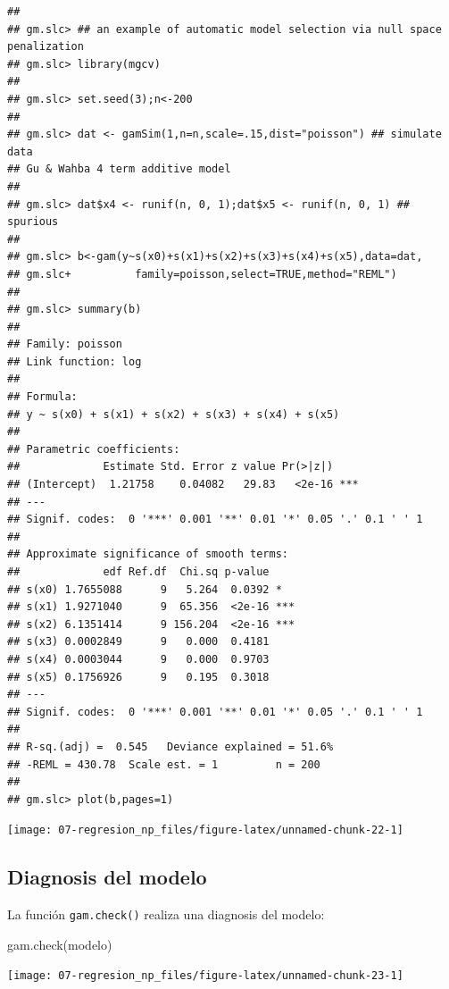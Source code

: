 \documentclass[
]{book}
\newenvironment{Shaded}{\begin{snugshade}}{\end{snugshade}}
\newcommand{\FunctionTok}[1]{\textcolor[rgb]{0.00,0.00,0.00}{#1}}
\newcommand{\NormalTok}[1]{#1}
\theoremstyle{break}
\theoremstyle{definition}
\theoremstyle{definition}
\theoremstyle{definition}
\theoremstyle{definition}
\theoremstyle{remark}
\begin{document}
\begin{verbatim}
## 
## gm.slc> ## an example of automatic model selection via null space penalization
## gm.slc> library(mgcv)
## 
## gm.slc> set.seed(3);n<-200
## 
## gm.slc> dat <- gamSim(1,n=n,scale=.15,dist="poisson") ## simulate data
## Gu & Wahba 4 term additive model
## 
## gm.slc> dat$x4 <- runif(n, 0, 1);dat$x5 <- runif(n, 0, 1) ## spurious
## 
## gm.slc> b<-gam(y~s(x0)+s(x1)+s(x2)+s(x3)+s(x4)+s(x5),data=dat,
## gm.slc+          family=poisson,select=TRUE,method="REML")
## 
## gm.slc> summary(b)
## 
## Family: poisson 
## Link function: log 
## 
## Formula:
## y ~ s(x0) + s(x1) + s(x2) + s(x3) + s(x4) + s(x5)
## 
## Parametric coefficients:
##             Estimate Std. Error z value Pr(>|z|)    
## (Intercept)  1.21758    0.04082   29.83   <2e-16 ***
## ---
## Signif. codes:  0 '***' 0.001 '**' 0.01 '*' 0.05 '.' 0.1 ' ' 1
## 
## Approximate significance of smooth terms:
##             edf Ref.df  Chi.sq p-value    
## s(x0) 1.7655088      9   5.264  0.0392 *  
## s(x1) 1.9271040      9  65.356  <2e-16 ***
## s(x2) 6.1351414      9 156.204  <2e-16 ***
## s(x3) 0.0002849      9   0.000  0.4181    
## s(x4) 0.0003044      9   0.000  0.9703    
## s(x5) 0.1756926      9   0.195  0.3018    
## ---
## Signif. codes:  0 '***' 0.001 '**' 0.01 '*' 0.05 '.' 0.1 ' ' 1
## 
## R-sq.(adj) =  0.545   Deviance explained = 51.6%
## -REML = 430.78  Scale est. = 1         n = 200
## 
## gm.slc> plot(b,pages=1)
\end{verbatim}

\begin{center}\texttt{[image: 07-regresion\_np\_files/figure-latex/unnamed-chunk-22-1]} \end{center}

\hypertarget{mgcv-diagnosis}{%
\subsection{Diagnosis del modelo}\label{mgcv-diagnosis}}

La función \texttt{gam.check()} realiza una diagnosis del modelo:

\begin{Shaded}
\begin{Highlighting}[]
\FunctionTok{gam.check}\NormalTok{(modelo)}
\end{Highlighting}
\end{Shaded}

\begin{center}\texttt{[image: 07-regresion\_np\_files/figure-latex/unnamed-chunk-23-1]} \end{center}
\end{document}
